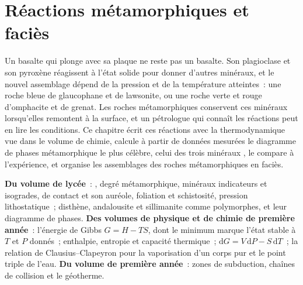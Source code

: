 \chapter{Réactions métamorphiques et faciès}\label{ch:b2:metamorphic-facies}

Un basalte qui plonge avec sa plaque ne reste pas un basalte. Son plagioclase et son pyroxène
réagissent à l'état solide pour donner d'autres minéraux, et le nouvel assemblage dépend de la
pression et de la température atteintes~: une roche bleue de glaucophane et de lawsonite, ou une
roche verte et rouge d'omphacite et de grenat. Les roches métamorphiques conservent ces minéraux lorsqu'elles
remontent à la surface, et un pétrologue qui connaît les réactions peut en lire les
conditions. Ce chapitre écrit ces réactions avec la thermodynamique vue dans le volume de chimie, calcule à partir de données mesurées
le diagramme de phases métamorphique le plus célèbre, celui des trois
minéraux , le compare à l'expérience,
et organise les assemblages des roches métamorphiques en faciès.

\begin{recall}
\textbf{Du volume de lycée}~: , degré métamorphique, minéraux indicateurs
et isogrades,  de contact et son auréole, foliation et schistosité,
pression lithostatique~; disthène, andalousite et sillimanite comme polymorphes, et leur
diagramme de phases. \textbf{Des volumes de physique et de chimie de première année}~: l'énergie de Gibbs
$G = H - TS$, dont le minimum marque l'état stable à $T$ et $P$ donnés~;
enthalpie, entropie et capacité thermique~; $\mathrm dG = V\,\mathrm dP - S\,\mathrm dT$~; la
relation de Clausius--Clapeyron pour la vaporisation d'un corps pur et le point
triple de l'eau. \textbf{Du volume de première année}~: zones de subduction, chaînes de collision et
le géotherme.
\end{recall}

